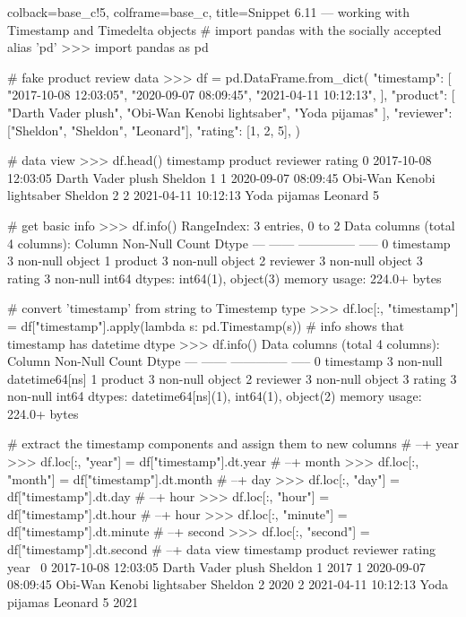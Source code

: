 \documentclass[a4paper,11pt]{book}
\numberwithin{figure}{chapter}
\numberwithin{table}{chapter}
\begin{document}
\begin{pythoncode}[linenos=True]{colback=base_c!5, colframe=base_c, title=\sffamily Snippet 6.11 --- working with Timestamp and Timedelta objects}
# import pandas with the socially accepted alias 'pd'
>>> import pandas as pd

# fake product review data
>>> df = pd.DataFrame.from\_dict(
        {
            "timestamp": [
                "2017-10-08 12:03:05",
                "2020-09-07 08:09:45",
                "2021-04-11 10:12:13",
            ],
            "product": [
		"Darth Vader plush",
		"Obi-Wan Kenobi lightsaber",
		"Yoda pijamas"
       ],
            "reviewer": ["Sheldon", "Sheldon", "Leonard"],
            "rating": [1, 2, 5],
        }
    )

# data view
>>> df.head()
             timestamp                    product reviewer  rating
0  2017-10-08 12:03:05          Darth Vader plush  Sheldon       1
1  2020-09-07 08:09:45  Obi-Wan Kenobi lightsaber  Sheldon       2
2  2021-04-11 10:12:13               Yoda pijamas  Leonard       5

# get basic info
>>> df.info()
RangeIndex: 3 entries, 0 to 2
Data columns (total 4 columns):
     Column     Non-Null Count  Dtype 
---  ------     --------------  ----- 
 0   timestamp  3 non-null      object
 1   product    3 non-null      object
 2   reviewer   3 non-null      object
 3   rating     3 non-null      int64 
dtypes: int64(1), object(3)
memory usage: 224.0+ bytes

# convert 'timestamp' from string to Timestemp type
>>> df.loc[:, "timestamp"] = df["timestamp"].apply(lambda s: pd.Timestamp(s))
# info shows that timestamp has datetime dtype  
>>> df.info()
Data columns (total 4 columns):
     Column     Non-Null Count  Dtype         
---  ------     --------------  -----         
 0   timestamp  3 non-null      datetime64[ns]
 1   product    3 non-null      object        
 2   reviewer   3 non-null      object        
 3   rating     3 non-null      int64         
dtypes: datetime64[ns](1), int64(1), object(2)
memory usage: 224.0+ bytes

# extract the timestamp components and assign them to new columns
# --+ year
>>> df.loc[:, "year"] = df["timestamp"].dt.year
# --+ month
>>> df.loc[:, "month"] = df["timestamp"].dt.month
# --+ day
>>> df.loc[:, "day"] = df["timestamp"].dt.day
# --+ hour
>>> df.loc[:, "hour"] = df["timestamp"].dt.hour
# --+ hour
>>> df.loc[:, "minute"] = df["timestamp"].dt.minute
# --+ second
>>> df.loc[:, "second"] = df["timestamp"].dt.second
# --+ data view
            timestamp                    product reviewer  rating  year  \
0 2017-10-08 12:03:05          Darth Vader plush  Sheldon       1  2017   
1 2020-09-07 08:09:45  Obi-Wan Kenobi lightsaber  Sheldon       2  2020   
2 2021-04-11 10:12:13               Yoda pijamas  Leonard       5  2021   


\end{pythoncode}
\end{document}
